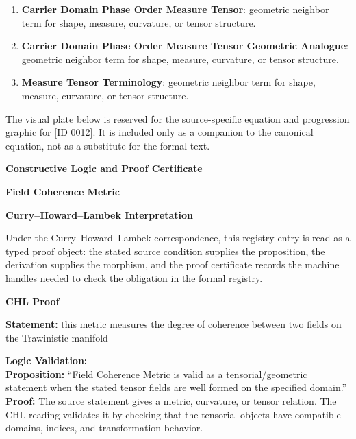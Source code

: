 \begingroup\footnotesize\sloppy
\begin{enumerate}[leftmargin=1.35em,itemsep=1pt,topsep=1pt,parsep=0pt]
\item \textbf{Carrier Domain Phase Order Measure Tensor}: geometric neighbor term for shape, measure, curvature, or tensor structure.
\item \textbf{Carrier Domain Phase Order Measure Tensor Geometric Analogue}: geometric neighbor term for shape, measure, curvature, or tensor structure.
\item \textbf{Measure Tensor Terminology}: geometric neighbor term for shape, measure, curvature, or tensor structure.
\end{enumerate}
\endgroup

\begingroup\footnotesize\sloppy
The visual plate below is reserved for the source-specific equation and progression graphic for [ID 0012]. It is included only as a companion to the canonical equation, not as a substitute for the formal text.
\par\endgroup
\ifTZPDarkEdition
{}
\fi

\clearpage
\begingroup\tzpsupportsetup
\noindent\textbf{\fontsize{10.8pt}{12.8pt}\selectfont [ID 0012] Constructive Logic and Proof Certificate}\par
\noindent\textbf{\fontsize{10pt}{12pt}\selectfont Field Coherence Metric}\par
\vspace{0.45em}
\begingroup
\footnotesize
\setlength{\parskip}{0.22em}
\setlength{\parindent}{0pt}
\noindent\textbf{Curry--Howard--Lambek Interpretation}\par
Under the Curry--Howard--Lambek correspondence, this registry entry is read as a typed proof
object: the stated source condition supplies the proposition, the derivation supplies the
morphism, and the proof certificate records the machine handles needed to check the obligation
in the formal registry.

\vspace{0.45em}
\noindent\textbf{CHL Proof}\par
\textbf{Statement:} this metric measures the degree of coherence between two fields on the Trawinistic
manifold

\textbf{Logic Validation:}\\
\textbf{Proposition:} ``Field Coherence Metric is valid as a tensorial/geometric statement when the stated
tensor fields are well formed on the specified domain.''\\
\textbf{Proof:} The source statement gives a metric, curvature, or tensor relation. The CHL reading
validates it by checking that the tensorial objects have compatible domains, indices,
and transformation behavior.

